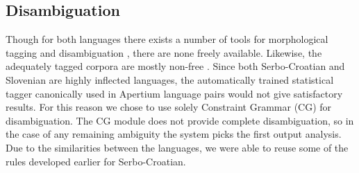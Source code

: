 \subsection{Disambiguation}
Though for both languages there exists a number of tools for
morphological tagging and disambiguation \cite{vitas2004intex,agic2008improving,snajder08automatic}, there
are none freely available. Likewise, the adequately tagged corpora are
mostly non-free \cite{erjavec2004multext,tadic2002building}.  Since both Serbo-Croatian and Slovenian are
highly inflected languages, the automatically trained statistical
tagger canonically used in Apertium language pairs would not give
satisfactory results. For this reason we chose to use solely
Constraint Grammar (CG) for disambiguation. The CG module does not
provide complete disambiguation, so in the case of any remaining
ambiguity the system picks the first output analysis.
Due to the similarities between the languages, we were able to
reuse some of the rules developed earlier for Serbo-Croatian.





